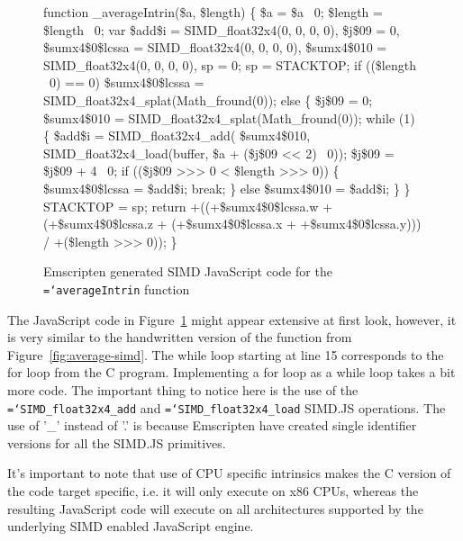 \documentclass[preprint]{sigplanconf}
\newcommand{\ttt}[1]{{\texttt{\hyphenchar\font=`\-\relax #1}}}%
\begin{document}
\begin{figure}
\begin{small}
\begin{program}[style=tt, number=true]
fu\tab{}nction \_averageIntrin(\$a, \$length) \{
  \$a = \$a \textbar\ 0;
  \$length = \$length \textbar\ 0;
  var \tab{}\$add\$i = SIMD\_float32x4(0, 0, 0, 0),
      \$j\$09 = 0,
      \$sumx4\$0\$lcssa = SIMD\_float32x4(0, 0, 0, 0),
      \$sumx4\$010 = SIMD\_float32x4(0, 0, 0, 0),
      sp = 0;\untab{}
  sp = STACKTOP;
  if\tab{} ((\$length \textbar\ 0) == 0)
    \$sumx4\$0\$lcssa = SIMD\_float32x4\_splat(Math\_fround(0));\untab{}
  el\tab{}se \{
    \$j\$09 = 0;
    \$sumx4\$010 = SIMD\_float32x4\_splat(Math\_fround(0));
    whi\tab{}le (1) \{
      \$a\tab{}dd\$i =
        SI\tab{}MD\_float32x4\_add(
          \$sumx4\$010,
          SIMD\_float32x4\_load(buffer, \$a + (\$j\$09 << 2) \textbar\ 0));\untab{}\untab{}
      \$j\$09 = \$j\$09 + 4 \textbar\ 0;
      if\tab{} (\!(\$j\$09 >>> 0 < \$length >>> 0)) \{
        \$sumx4\$0\$lcssa = \$add\$i;
        break;\untab{}
      \} else \$sumx4\$010 = \$add\$i;\untab{}
    \}\untab{}
  \}
  STACKTOP = sp;
  return\tab{} +((+\$sumx4\$0\$lcssa.w + (+\$sumx4\$0\$lcssa.z +
        (+\$sumx4\$0\$lcssa.x + +\$sumx4\$0\$lcssa.y))) /
        +(\$length >>> 0));\untab{}\untab{}
\}
\end{program}
\end{small}
\caption{Emscripten generated SIMD JavaScript code for the \ttt{averageIntrin} function}
\label{fig:average-intrin-js}
\end{figure}

The JavaScript code in Figure~\ref{fig:average-intrin-js} might appear
extensive at first look, however, it is very similar to the handwritten
version of the function from Figure~\ref{fig:average-simd}.  The while loop
starting at line 15 corresponds to the for loop from the C program.  Implementing
a for loop as a while loop takes a bit more code.  The important thing to notice
here is the use of the \ttt{SIMD\_float32x4\_add} and \ttt{SIMD\_float32x4\_load}
SIMD.JS operations.  The use of '\_' instead of '.' is because Emscripten have
created single identifier versions for all the SIMD.JS primitives.

It's important to note that use of CPU specific intrinsics makes the C version
of the code target specific, i.e. it will only execute on x86 CPUs, whereas the
resulting JavaScript code will execute on all architectures supported by the
underlying SIMD enabled JavaScript engine.
\end{document}
